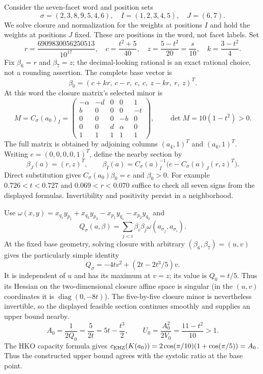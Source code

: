 Consider the seven-facet word and position sets
\[
 \sigma=(2,3,8,9,5,4,6),\quad I=(1,2,3,4,5),\quad J=(6,7).
\]
We solve closure and normalization for the weights at positions $I$ and
hold the weights at positions $J$ fixed. These are positions in the word,
not facet labels. Set
\[
 r=\frac{6909830056250513}{10^{17}},\quad
 c=\frac{t^2+5}{40},\quad z=\frac{5-t^2}{20}=\frac{s}{10},\quad
 k=\frac{3-t^2}{4}.
\]
Fix $\beta_6=r$ and $\beta_7=z$; the decimal-looking rational is an exact rational
choice, not a rounding assertion. The complete base vector is
\[
 \beta_0=(c+kr,\ c-r,\ c,\ c,\ z-kr,\ r,\ z)^T.
\]
At this word the closure matrix's selected minor is
\[
 M=C_\sigma(a_0)_I=
 \begin{pmatrix}
 -\alpha&-d&0&0&1\\b&0&0&0&-t\\0&0&0&-b&0\\
 0&0&d&\alpha&0\\1&1&1&1&1
 \end{pmatrix},\qquad \det M=10(1-t^2)>0.
\]
The full matrix is obtained by adjoining columns $(a_4,1)^T$ and $(a_6,1)^T$.
Writing $e=(0,0,0,0,1)^T$, define the nearby section by
\[
 \beta_J(a)=(r,z)^T,\qquad
 \beta_I(a)=C_\sigma(a)_I^{-1}\bigl(e-C_\sigma(a)_J(r,z)^T\bigr).
\]
Direct substitution gives $C_\sigma(a_0)\beta_0=e$ and $\beta_0>0$.
For example $0.726<t<0.727$ and $0.069<r<0.070$ suffice to check all
seven signs from the displayed formulas. Invertibility and positivity persist
in a neighborhood.

Use $\omega(x,y)=x_{q_1}y_{p_1}+x_{q_2}y_{p_2}-x_{p_1}y_{q_1}-x_{p_2}y_{q_2}$ and
\[
 Q_\sigma(a,\beta)=\sum_{j<i}\beta_i\beta_j\omega(a_{\sigma_j},a_{\sigma_i}).
\]
At the fixed base geometry, solving closure with arbitrary
$(\beta_6,\beta_7)=(u,v)$ gives the particularly simple identity
\[
 Q_\sigma=-4tv^2+(2t-2t^3/5)v.
\]
It is independent of $u$ and has its maximum at $v=z$; its value is $Q_0=t/5$.
Thus its Hessian on the two-dimensional closure affine space is singular
(in the $(u,v)$ coordinates it is $\operatorname{diag}(0,-8t)$).
The five-by-five closure minor is nevertheless invertible, so the displayed
feasible section continues smoothly and supplies an upper bound nearby.
\[
 A_0=\frac1{2Q_0}=\frac5{2t}=5t-\frac{t^3}{2},\qquad
 U_0=\frac{A_0^2}{2V_0}=\frac{11-t^2}{10}>1.
\]
The HKO capacity formula gives
$c_{\rm EHZ}(K(a_0))=2\cos(\pi/10)(1+\cos(\pi/5))=A_0$.
Thus the constructed upper bound agrees with the systolic ratio at the
base point.

